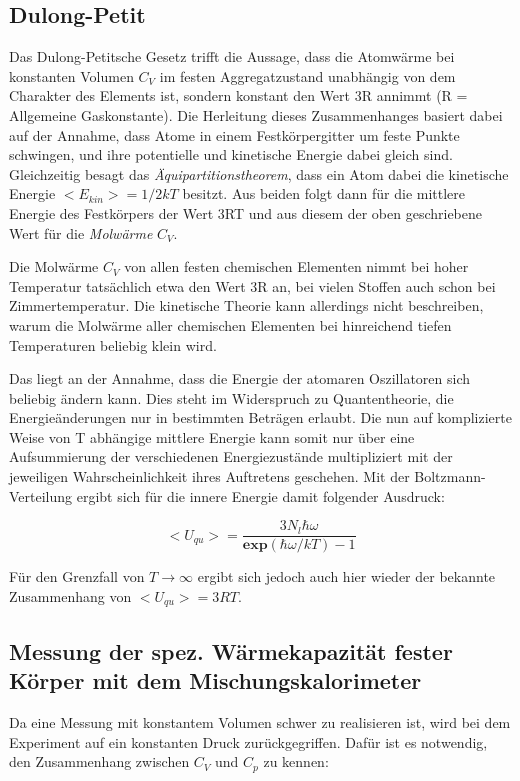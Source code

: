 \subsection{Dulong-Petit}

Das Dulong-Petitsche Gesetz trifft die Aussage, dass die Atomwärme bei konstanten
Volumen $C_V$ im festen Aggregatzustand unabhängig von dem Charakter des Elements
ist, sondern konstant den Wert 3R annimmt (R = Allgemeine Gaskonstante). Die
Herleitung dieses Zusammenhanges basiert dabei auf der Annahme, dass Atome in
einem Festkörpergitter um feste Punkte schwingen, und ihre potentielle und
kinetische Energie dabei gleich sind. Gleichzeitig besagt das
\emph{Äquipartitionstheorem}, dass ein Atom dabei die kinetische Energie
$ < E_{kin} > = 1/2 k T$ besitzt. Aus beiden folgt dann für die mittlere Energie
des Festkörpers der Wert 3RT und aus diesem der oben geschriebene Wert für die
\emph{Molwärme} $C_V$.

Die Molwärme $C_V$ von allen festen chemischen Elementen nimmt bei hoher
Temperatur tatsächlich etwa den Wert 3R an, bei vielen Stoffen auch schon bei
Zimmertemperatur. Die kinetische Theorie kann allerdings nicht beschreiben, warum
die Molwärme aller chemischen Elementen bei hinreichend tiefen Temperaturen
beliebig klein wird.

Das liegt an der Annahme, dass die Energie der atomaren Oszillatoren sich
beliebig ändern kann. Dies steht im Widerspruch zu Quantentheorie, die
Energieänderungen nur in bestimmten Beträgen erlaubt. Die nun auf
komplizierte Weise von T abhängige mittlere Energie kann somit nur über
eine Aufsummierung der verschiedenen Energiezustände multipliziert mit der
jeweiligen Wahrscheinlichkeit ihres Auftretens geschehen. Mit der
Boltzmann-Verteilung ergibt sich für die innere Energie damit folgender Ausdruck:

\begin{equation}
  < U_{qu} > = \frac{ 3 N_l \hbar \omega}{\textbf{exp} (\hbar \omega / kT) - 1}
\end{equation}

Für den Grenzfall von $ T \to \infty$ ergibt sich jedoch auch hier wieder der
bekannte Zusammenhang von $< U_{qu} > = 3RT$.

\subsection{Messung der spez. Wärmekapazität fester Körper mit dem Mischungskalorimeter}

Da eine Messung mit konstantem Volumen schwer zu realisieren ist, wird bei dem
Experiment auf ein konstanten Druck zurückgegriffen. Dafür ist es notwendig, den
Zusammenhang zwischen $C_V$ und $C_p$ zu kennen:


